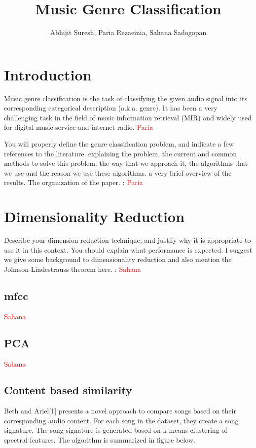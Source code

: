 \documentclass[12pt]{article}
\title{Music Genre Classification}
\author{Abhijit Suresh, Paria Rezaeinia, Sahana Sadogopan}
\begin{document}
	\maketitle

\section{Introduction}

Music genre classification is the task of classifying the given audio signal into its corresponding categorical description (a.k.a. genre). It has been a very challenging task in the field of music information retrieval (MIR) and widely used for digital music service and internet radio.  \textcolor{red}{Paria}

You will properly define the genre classification problem, and
indicate a few references to the literature.
explaining the problem, the current and common methods to solve this problem. the way that we approach it, the algorithms that we use and the reason we use these algorithms. a very brief overview of the results. The organization of the paper. : \textcolor{red}{Paria}
\section{Dimensionality Reduction}
Describe your dimension reduction technique, and justify why it
is appropriate to use it in this context. You should explain what
performance is expected.
I suggest we give some background to dimensionality reduction and also mention the Johnson-Lindestrauss theorem here. : \textcolor{red}{Sahana}
\subsection{mfcc} \textcolor{red}{Sahana}

\subsection{PCA} \textcolor{red}{Sahana}

\subsection{Content based similarity}
Beth and Ariel[1] presents a novel approach to compare songs based on their corresponding audio content. For each song in the dataset, they create a song signature. The song signature is generated based on k-means clustering of spectral features. The algorithm is summarized in figure below.
\end{document}
